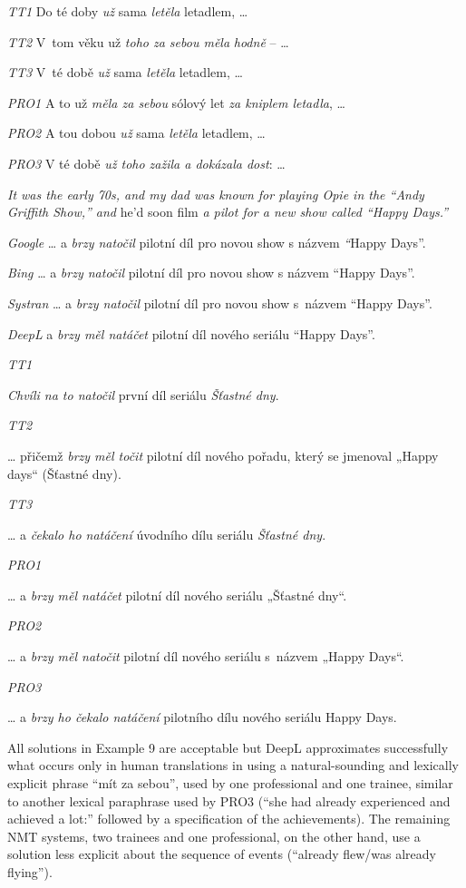 \documentclass[output=paper]{langscibook}
\begin{document}
\textit{TT1} Do té doby \textit{už} sama \textit{letěla} letadlem, …

\textit{TT2} V~tom věku už \textit{toho za sebou měla} \textit{hodně} – …

\textit{TT3} V~té době \textit{už} sama \textit{letěla} letadlem, …

\textit{PRO1} A to už \textit{měla za sebou} sólový let \textit{za kniplem letadla}, …

\textit{PRO2} A tou dobou \textit{už} sama \textit{letěla} letadlem, …

\textit{PRO3} V té době \textit{už toho zažila a dokázala dost}: …

\z
\ea \label{ex:kamenicka:6}

\textit{It was the early 70s, and my dad was known for playing Opie in the “Andy Griffith Show,” and} he'd soon film \textit{a pilot for a new show called “Happy Days.”}

\textit{Google} … a \textit{brzy natočil} pilotní díl pro novou show s názvem \textit{“}Happy Days”.

\textit{Bing} … a \textit{brzy natočil} pilotní díl pro novou show s názvem “Happy Days”.

\textit{Systran} … a \textit{brzy natočil} pilotní díl pro novou show s~názvem “Happy Days”.

\textit{DeepL} a \textit{brzy měl natáčet} pilotní díl nového seriálu “Happy Days”.

\textit{TT1}

{\textit{Chvíli na to natočil} první díl seriálu \textit{Šťastné dny}.}

\textit{TT2}

{ … přičemž \textit{brzy měl točit} pilotní díl nového pořadu, který se jmenoval „Happy days“ (Šťastné dny).}

\textit{TT3}

{ … a \textit{čekalo ho natáčení} úvodního dílu seriálu \textit{Šťastné dny}.}

\textit{PRO1}

{ … a \textit{brzy měl natáčet} pilotní díl nového seriálu „Šťastné dny“.}

\textit{PRO2}

{ … a \textit{brzy měl natočit} pilotní díl nového seriálu s~názvem „Happy Days“.}

\textit{PRO3}

{ … a \textit{brzy ho čekalo natáčení} pilotního dílu nového seriálu Happy Days.}

\z
All solutions in Example 9 are acceptable but DeepL approximates successfully what occurs only in human translations in using a natural-sounding and lexically explicit phrase “mít za sebou”, used by one professional and one trainee, similar to another lexical paraphrase used by PRO3 (“she had already experienced and achieved a lot:” followed by a specification of the achievements). The remaining NMT systems, two trainees and one professional, on the other hand, use a solution less explicit about the sequence of events (“already flew/was already flying”).
\end{document}
